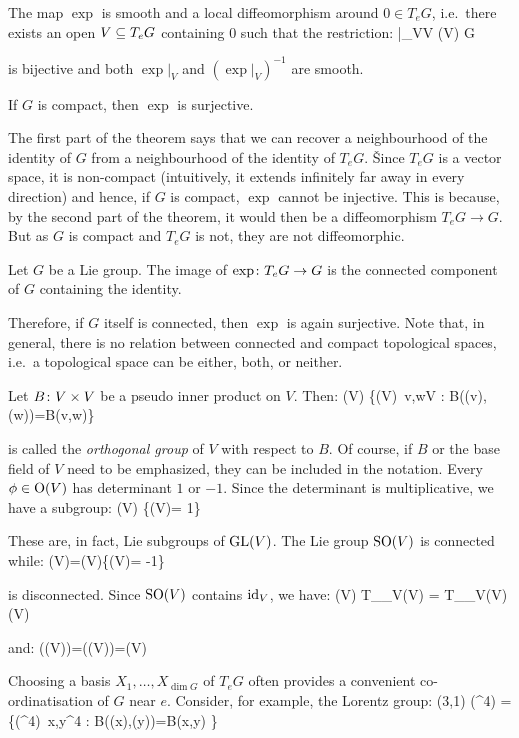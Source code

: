 \bt[]
\ben[label=\roman*)]
\item The map $\exp$ is smooth and a local diffeomorphism around $0\in T_e G$, i.e.\ there exists an open $V\subseteq T_e G$
containing $0$ such that the restriction:
\bse
\exp|_V\cl V \to \exp(V) \se G
\ese

is bijective and both $\exp|_V$ and $(\exp|_V)^{-1}$ are smooth.
\item If $G$ is compact, then $\exp$ is surjective.
\een
\et

The first part of the theorem says that we can recover a neighbourhood of the identity of $G$ from a neighbourhood of
the identity of $T_e G$. \v

Since $T_e G$ is a vector space, it is non-compact (intuitively, it extends infinitely far away in every direction)
and hence, if $G$ is compact, $\exp$ cannot be injective. This is because, by the second part of the theorem, it
would then be a diffeomorphism $T_e G\to G$. But as $G$ is compact and $T_e G$ is not, they are not diffeomorphic.

\bt[]
Let $G$ be a Lie group. The image of $\exp\colon T_e G\to G$ is the connected component of $G$ containing the identity.
\et

Therefore, if $G$ itself is connected, then $\exp$ is again surjective. Note that, in general, there is no relation
between connected and compact topological spaces, i.e.\ a topological space can be either, both, or neither.

\be
Let $B\colon V\times V$ be a pseudo inner product on $V$. Then:
\bse
\Ort(V) \coloneqq \{\phi\in \GL(V)\mid \forall \, v,w\in V : B(\phi(v), \phi(w))=B(v,w)\}
\ese

is called the \emph{orthogonal group} of $V$ with respect to $B$. Of course, if $B$ or the base field of $V$ need to
be emphasized, they can be included in the notation. Every $\phi\in \operatorname{O}(V)$ has determinant $1$ or $-1$. Since the
determinant is multiplicative, we have a subgroup:
\bse
\SO(V) \coloneqq \{\phi\in \Ort(V)\mid \det\phi = 1\}
\ese

These are, in fact, Lie subgroups of $\operatorname{GL}(V)$. The Lie group $\operatorname{SO}(V)$ is connected while:
\bse
\Ort(V)=\SO(V)\cup \{\phi\in \Ort(V)\mid \det \phi = -1\}
\ese

is disconnected. Since $\operatorname{SO}(V)$ contains $\operatorname{id}_V$, we have:
\bse
\so(V) \coloneqq T_{\id_V}\!\SO(V) = T_{\id_V}\!\Ort(V) \eqqcolon \ort(V)
\ese

and:
\bse
\exp(\so(V))=\exp(\ort(V))=\SO(V)
\ese
\ee

Choosing a basis $X_1,\ldots,X_{\dim G}$ of $T_e G$ often provides a convenient co-ordinatisation of $G$ near $e$.
Consider, for example, the Lorentz group:
\bse
\Ort(3,1) \equiv \Ort(\R^4) = \{\Lambda\in \GL(\R^4)\mid \forall \, x,y\in \R^4 : B(\Lambda(x),\Lambda(y))=B(x,y) \}
\ese

